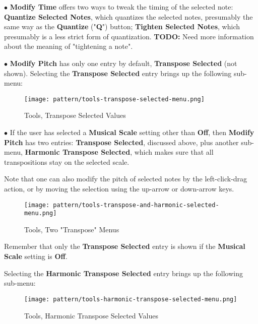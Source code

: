    $\bullet$ \textbf{Modify Time} offers two ways to tweak the timing of the
   selected note:
   \textbf{Quantize Selected Notes}, which quantizes the selected
   notes, presumably the same way as the \textbf{Quantize} ("\textbf{Q}")
   button;
   \textbf{Tighten Selected Notes}, which presumably is a less
   strict form of quantization.
   \textbf{TODO:}
   Need more information about the meaning of "tightening a note".

   $\bullet$ \textbf{Modify Pitch} has only one entry by default,
   \textbf{Transpose Selected} (not shown).
   Selecting the \textbf{Transpose Selected} entry
   brings up the following sub-menu:

\begin{figure}[H]
   \centering 
   \texttt{[image: pattern/tools-transpose-selected-menu.png]}
   \caption{Tools, Transpose Selected Values}
   \label{fig:pattern_editor_tools_transpose_selected_menu}
\end{figure}

   $\bullet$ If the user has selected a
   \textbf{Musical Scale} setting other than \textbf{Off},
   then \textbf{Modify Pitch} has two entries:
   \textbf{Transpose Selected}, discussed above, plus
   another sub-menu,
   \textbf{Harmonic Transpose Selected}, which makes sure that all
   transpositions stay on the selected scale.

   Note that one can also modify the pitch of selected notes by the
   left-click-drag action, or by moving the selection using the
   up-arrow or down-arrow keys.

\begin{figure}[H]
   \centering 
   \texttt{[image: pattern/tools-transpose-and-harmonic-selected-menu.png]}
   \caption{Tools, Two "Transpose" Menus}
   \label{fig:pattern_editor_tools_two_transpose_menus}
\end{figure}

   Remember that only the \textbf{Transpose Selected} entry is shown if the
   \textbf{Musical Scale} setting is \textbf{Off}.

   Selecting the \textbf{Harmonic Transpose Selected} entry brings up the
   following sub-menu:

\begin{figure}[H]
   \centering 
   \texttt{[image: pattern/tools-harmonic-transpose-selected-menu.png]}
   \caption{Tools, Harmonic Transpose Selected Values}
   \label{fig:pattern_editor_tools_harmonic_transpose_menu}
\end{figure}

